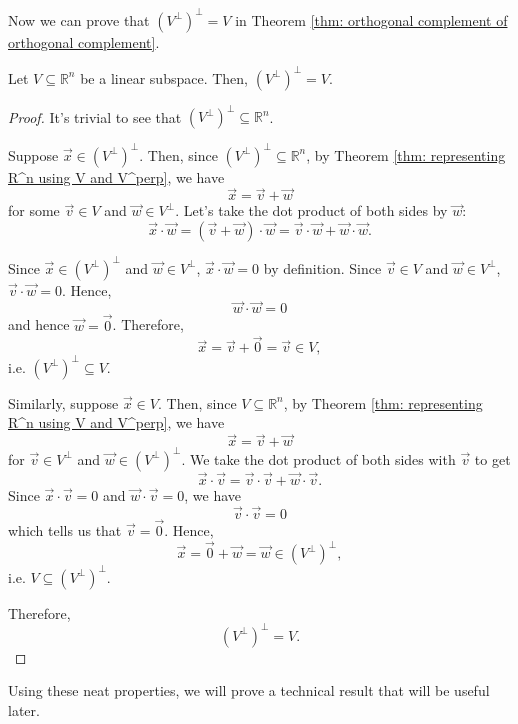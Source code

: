 \documentclass[]{book}
\newcommand{\R}{\ensuremath{\mathbb{R}}}
\begin{document}
Now we can prove that $\left(V^{\perp}\right)^{\perp} = V$ in Theorem \ref{thm: orthogonal complement of orthogonal complement}.
\begin{theorem}
    \label{thm: orthogonal complement of orthogonal complement}
    Let $V \subseteq \R^n$ be a linear subspace. Then, $\left(V^{\perp}\right)^{\perp} = V$.
\begin{proof}
    It's trivial to see that $\left(V^{\perp}\right)^{\perp} \subseteq \R^n$.
    
    Suppose $\vec{x} \in \left(V^{\perp}\right)^{\perp}$. Then, since $\left(V^{\perp}\right)^{\perp} \subseteq \R^n$, by Theorem \ref{thm: representing R^n using V and V^perp}, we have
    \[\vec{x} = \vec{v} + \vec{w}\] for some $\vec{v} \in V$ and $\vec{w} \in V^{\perp}$. Let's take the dot product of both sides by $\vec{w}$:
    \[\vec{x} \cdot \vec{w} = (\vec{v} + \vec{w}) \cdot \vec{w} = \vec{v}\cdot\vec{w} + \vec{w}\cdot\vec{w}.\]
    
    Since $\vec{x} \in \left(V^{\perp}\right)^{\perp}$ and $\vec{w} \in V^{\perp}$, $\vec{x} \cdot \vec{w} = 0$ by definition. Since $\vec{v} \in V$ and $\vec{w} \in V^{\perp}$, $\vec{v} \cdot \vec{w} = 0$. Hence,
    \[\vec{w} \cdot \vec{w} = 0\] and hence $\vec{w} = \vec{0}$.
    Therefore,
    \[\vec{x} = \vec{v} + \vec{0} = \vec{v} \in V,\] i.e. $\left(V^{\perp}\right)^{\perp} \subseteq V$.
    
    Similarly, suppose $\vec{x} \in V$. Then, since $V \subseteq \R^n$, by Theorem \ref{thm: representing R^n using V and V^perp}, we have
    \[\vec{x} = \vec{v} + \vec{w}\] for $\vec{v} \in V^{\perp}$ and $\vec{w} \in \left(V^{\perp}\right)^{\perp}$. We take the dot product of both sides with $\vec{v}$ to get
    \[\vec{x} \cdot \vec{v} = \vec{v} \cdot \vec{v} + \vec{w} \cdot \vec{v}.\] Since $\vec{x} \cdot \vec{v} = 0$ and $\vec{w} \cdot \vec{v} = 0$, we have
    \[\vec{v} \cdot \vec{v} = 0\] which tells us that $\vec{v} = \vec{0}$. Hence,
    \[\vec{x} = \vec{0} + \vec{w} = \vec{w} \in \left(V^{\perp}\right)^{\perp},\] i.e. $V \subseteq \left(V^{\perp}\right)^{\perp}$. 
    
    Therefore,
    \[\left(V^{\perp}\right)^{\perp} = V.\]
\end{proof}
\end{theorem}

Using these neat properties, we will prove a technical result that will be useful later.
\end{document}
